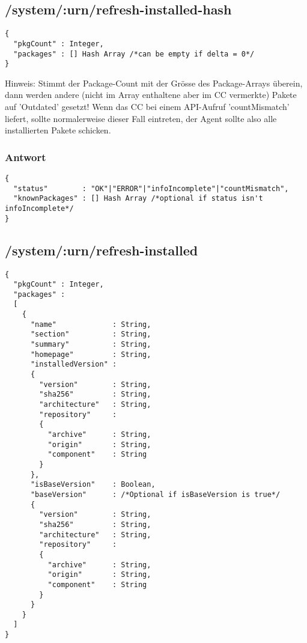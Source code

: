 \subsection*{/system/:urn/refresh-installed-hash}

\begin{verbatim}
{
  "pkgCount" : Integer,
  "packages" : [] Hash Array /*can be empty if delta = 0*/
}
\end{verbatim}

Hinweis: Stimmt der Package-Count mit der Grösse des Package-Arrays überein, dann werden andere (nicht im Array enthaltene aber im CC vermerkte) Pakete auf 'Outdated' gesetzt! Wenn das CC bei einem API-Aufruf 'countMismatch' liefert, sollte normalerweise dieser Fall eintreten, der Agent sollte also alle installierten Pakete schicken.


\subsubsection*{Antwort}

\begin{verbatim}
{
  "status"        : "OK"|"ERROR"|"infoIncomplete"|"countMismatch",
  "knownPackages" : [] Hash Array /*optional if status isn't infoIncomplete*/
}
\end{verbatim}


\subsection*{/system/:urn/refresh-installed}

\begin{verbatim}
{
  "pkgCount" : Integer,
  "packages" :
  [
    {
      "name"             : String,
      "section"          : String,
      "summary"          : String,
      "homepage"         : String,
      "installedVersion" :
      {
        "version"        : String,
        "sha256"         : String,
        "architecture"   : String,
        "repository"     :
        {
          "archive"      : String,
          "origin"       : String,
          "component"    : String
        }
      },
      "isBaseVersion"    : Boolean,
      "baseVersion"      : /*Optional if isBaseVersion is true*/
      {
        "version"        : String,
        "sha256"         : String,
        "architecture"   : String,
        "repository"     :
        {
          "archive"      : String,
          "origin"       : String,
          "component"    : String
        }
      }
    }
  ]
}
\end{verbatim}

